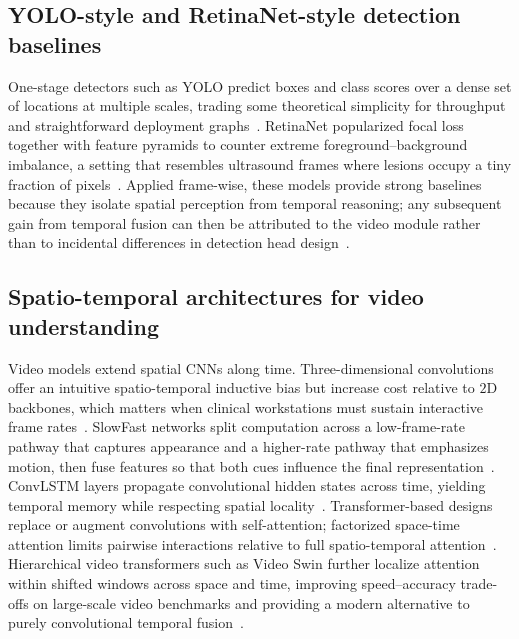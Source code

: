 \documentclass[
english,                 %
bibtex,                  %
]{kththesis}
\numberwithin{listing}{chapter}
\begin{document}
\subsection{YOLO-style and RetinaNet-style detection baselines}
\label{sec:detection_baselines}
One-stage detectors such as YOLO predict boxes and class scores over a dense set of locations at multiple scales, trading some theoretical simplicity for throughput and straightforward deployment graphs~\cite{redmon2018_yolov3}.
RetinaNet popularized focal loss together with feature pyramids to counter extreme foreground--background imbalance, a setting that resembles ultrasound frames where lesions occupy a tiny fraction of pixels~\cite{lin2017_focal_loss_retinanet}.
Applied frame-wise, these models provide strong baselines because they isolate spatial perception from temporal reasoning; any subsequent gain from temporal fusion can then be attributed to the video module rather than to incidental differences in detection head design~\cite{lin2022_buv_miccai}.

\subsection{Spatio-temporal architectures for video understanding}
\label{sec:spatiotemporal_architectures}
Video models extend spatial CNNs along time.
Three-dimensional convolutions offer an intuitive spatio-temporal inductive bias but increase cost relative to $2\mathrm{D}$ backbones, which matters when clinical workstations must sustain interactive frame rates~\cite{huang2023_3dcnn_video_review}.
SlowFast networks split computation across a low-frame-rate pathway that captures appearance and a higher-rate pathway that emphasizes motion, then fuse features so that both cues influence the final representation~\cite{feichtenhofer2019_slowfast}.
ConvLSTM layers propagate convolutional hidden states across time, yielding temporal memory while respecting spatial locality~\cite{shi2015_convlstm}.
Transformer-based designs replace or augment convolutions with self-attention; factorized space-time attention limits pairwise interactions relative to full spatio-temporal attention~\cite{bertasius2021_spacetime_attention,dosovitskiy2021_vit}.
Hierarchical video transformers such as Video Swin further localize attention within shifted windows across space and time, improving speed--accuracy trade-offs on large-scale video benchmarks and providing a modern alternative to purely convolutional temporal fusion~\cite{liu2022_video_swin_transformer}.
\end{document}
